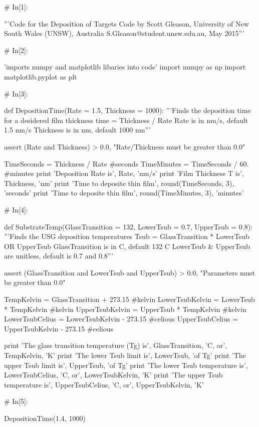 \documentclass[a4paper,8pt]{article}
\begin{document}
\begin{python}

# In[1]:

'''Code for the Deposition of Targets
Code by Scott Gleason, University of New South Wales (UNSW), Australia 
S.Gleason@student.unsw.edu.au, May 2015'''


# In[2]:

'imports numpy and matplotlib libaries into code'
import numpy as np
import matplotlib.pyplot as plt


# In[3]:

def DepositionTime(Rate = 1.5, Thickness = 1000):
'''Finds the deposition time for a desidered film thickness 
time = Thickness / Rate
Rate is in nm/s, default 1.5 nm/s
Thickness is in nm, default 1000 nm'''

assert (Rate and Thickness) > 0.0, "Rate/Thickness must be greater than 0.0"

TimeSeconds = Thickness / Rate #seconds
TimeMinutes = TimeSeconds / 60. #minutes
print 'Deposition Rate is', Rate, 'nm/s'
print 'Film Thickness T is', Thickness, 'nm'
print 'Time to deposite thin film', round(TimeSeconds, 3), 'seconds'
print 'Time to deposite thin film', round(TimeMinutes, 3), 'minutes'


# In[4]:

def SubstrateTemp(GlassTransition = 132, LowerTsub = 0.7, UpperTsub = 0.8):
'''Finds the USG deposition temperatures 
Tsub = GlassTransition * LowerTsub OR UpperTsub
GlassTransition is in C, default 132 C
LowerTsub & UpperTsub are unitless, default is 0.7 and 0.8'''

assert (GlassTransition and LowerTsub and UpperTsub) > 0.0, "Parameters must be greater than 0.0"

TempKelvin = GlassTransition + 273.15 #kelvin
LowerTsubKelvin = LowerTsub * TempKelvin #kelvin
UpperTsubKelvin = UpperTsub * TempKelvin #kelvin
LowerTsubCelius = LowerTsubKelvin - 273.15 #celious
UpperTsubCelius = UpperTsubKelvin - 273.15 #celious

print 'The glass transition temperature (Tg) is', GlassTransition, 'C,  or', TempKelvin, 'K'
print 'The lower Tsub limit is', LowerTsub, 'of Tg'
print 'The upper Tsub limit is', UpperTsub, 'of Tg'
print 'The lower Tsub temperature is', LowerTsubCelius, 'C,  or', LowerTsubKelvin, 'K'
print 'The upper Tsub temperature is', UpperTsubCelius, 'C,  or', UpperTsubKelvin, 'K'


# In[5]:

DepositionTime(1.4, 1000)



\end{python}
\end{document}
